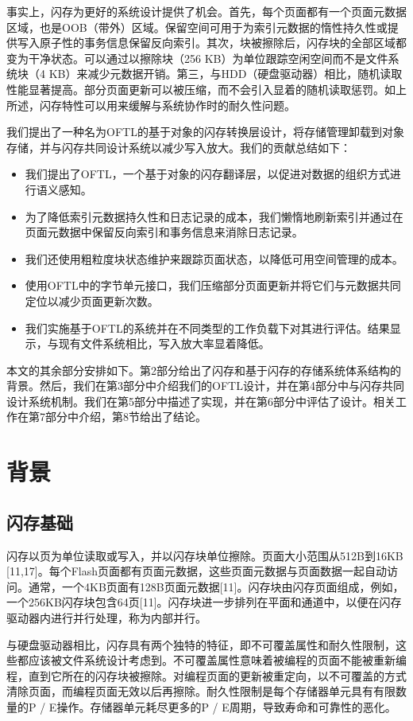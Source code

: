 事实上，闪存为更好的系统设计提供了机会。首先，每个页面都有一个页面元数据区域，也是OOB（带外）区域。保留空间可用于为索引元数据的惰性持久性或提供写入原子性的事务信息保留反向索引。其次，块被擦除后，闪存块的全部区域都变为干净状态。可以通过以擦除块（256 KB）为单位跟踪空闲空间而不是文件系统块（4 KB）来减少元数据开销。第三，与HDD（硬盘驱动器）相比，随机读取性能显著提高。部分页面更新可以被压缩，而不会引入显着的随机读取惩罚。如上所述，闪存特性可以用来缓解与系统协作时的耐久性问题。

我们提出了一种名为OFTL的基于对象的闪存转换层设计，将存储管理卸载到对象存储，并与闪存共同设计系统以减少写入放大。我们的贡献总结如下：

\begin{itemize}
\item 我们提出了OFTL，一个基于对象的闪存翻译层，以促进对数据的组织方式进行语义感知。
\item 为了降低索引元数据持久性和日志记录的成本，我们懒惰地刷新索引并通过在页面元数据中保留反向索引和事务信息来消除日志记录。
\item 我们还使用粗粒度块状态维护来跟踪页面状态，以降低可用空间管理的成本。
\item 使用OFTL中的字节单元接口，我们压缩部分页面更新并将它们与元数据共同定位以减少页面更新次数。
\item 我们实施基于OFTL的系统并在不同类型的工作负载下对其进行评估。结果显示，与现有文件系统相比，写入放大率显着降低。
\end{itemize}

本文的其余部分安排如下。第2部分给出了闪存和基于闪存的存储系统体系结构的背景。然后，我们在第3部分中介绍我们的OFTL设计，并在第4部分中与闪存共同设计系统机制。我们在第5部分中描述了实现，并在第6部分中评估了设计。相关工作在第7部分中介绍，第8节给出了结论。

\section{背景}
\subsection{闪存基础}
闪存以页为单位读取或写入，并以闪存块单位擦除。页面大小范围从512B到16KB [11,17]。每个Flash页面都有页面元数据，这些页面元数据与页面数据一起自动访问。通常，一个4KB页面有128B页面元数据[11]。闪存块由闪存页面组成，例如，一个256KB闪存块包含64页[11]。闪存块进一步排列在平面和通道中，以便在闪存驱动器内进行并行处理，称为内部并行。

与硬盘驱动器相比，闪存具有两个独特的特征，即不可覆盖属性和耐久性限制，这些都应该被文件系统设计考虑到。不可覆盖属性意味着被编程的页面不能被重新编程，直到它所在的闪存块被擦除。对编程页面的更新被重定向，以不可覆盖的方式清除页面，而编程页面无效以后再擦除。耐久性限制是每个存储器单元具有有限数量的P / E操作。存储器单元耗尽更多的P / E周期，导致寿命和可靠性的恶化。

